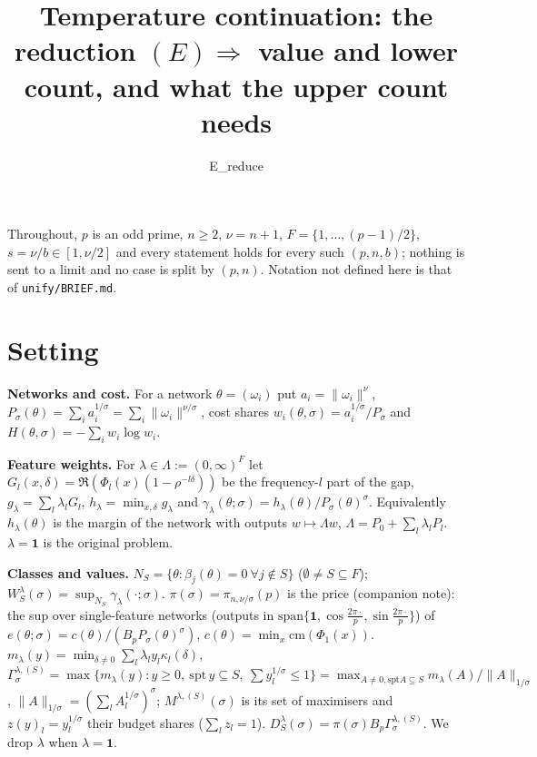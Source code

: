 \documentclass[11pt]{article}
\theoremstyle{remark}\newtheorem{remark}[theorem]{Remark}
\begin{document}
\title{Temperature continuation: the reduction $(E)\Rightarrow$ value and lower count, and what the upper count needs}
\author{E\_reduce}\date{}\maketitle

Throughout, $p$ is an odd prime, $n\ge2$, $\nu=n+1$, $F=\{1,\dots,(p-1)/2\}$, $s=\nu/b\in[1,\nu/2]$ and every
statement holds for every such $(p,n,b)$; nothing is sent to a limit and no case is split by $(p,n)$.
Notation not defined here is that of \texttt{unify/BRIEF.md}.

\section{Setting}
\textbf{Networks and cost.} For a network $\theta=(\omega_i)$ put $a_i=\|\omega_i\|^\nu$, $P_\sigma(\theta)=\sum_ia_i^{1/\sigma}
=\sum_i\|\omega_i\|^{\nu/\sigma}$, cost shares $w_i(\theta,\sigma)=a_i^{1/\sigma}/P_\sigma$ and $H(\theta,\sigma)=-\sum_iw_i\log w_i$.

\textbf{Feature weights.} For $\lambda\in\Lambda:=(0,\infty)^F$ let $G_l(x,\delta)=\Re(\Phi_l(x)(1-\rho^{-l\delta}))$ be the
frequency-$l$ part of the gap, $g_\lambda=\sum_l\lambda_lG_l$, $h_\lambda=\min_{x,\delta}g_\lambda$ and
$\gamma_\lambda(\theta;\sigma)=h_\lambda(\theta)/P_\sigma(\theta)^\sigma$. Equivalently $h_\lambda(\theta)$ is the margin of the
network with outputs $w\mapsto\Lambda w$, $\Lambda=P_0+\sum_l\lambda_lP_l$. $\lambda=\mathbf 1$ is the original problem.

\textbf{Classes and values.} $N_S=\{\theta:\beta_j(\theta)=0\ \forall j\notin S\}$ ($\emptyset\ne S\subseteq F$);
$W^\lambda_S(\sigma)=\sup_{N_S}\gamma_\lambda(\cdot;\sigma)$. $\pi(\sigma)=\pi_{n,\nu/\sigma}(p)$ is the price
(companion note): the sup over single-feature networks (outputs in $\mathrm{span}\{\mathbf1,\cos\frac{2\pi\cdot}p,\sin\frac{2\pi\cdot}p\}$)
of $e(\theta;\sigma)=c(\theta)/(B_pP_\sigma(\theta)^\sigma)$, $c(\theta)=\min_x\mathrm{cm}(\Phi_1(x))$.
$m_\lambda(y)=\min_{\delta\ne0}\sum_l\lambda_ly_l\kappa_l(\delta)$,
$\Gamma^{\lambda,(S)}_\sigma=\max\{m_\lambda(y):y\ge0,\ \mathrm{spt}\,y\subseteq S,\ \sum y_l^{1/\sigma}\le1\}
=\max_{A\ne0,\mathrm{spt}A\subseteq S}m_\lambda(A)/\|A\|_{1/\sigma}$, $\|A\|_{1/\sigma}=(\sum_lA_l^{1/\sigma})^\sigma$;
$M^{\lambda,(S)}(\sigma)$ is its set of maximisers and $z(y)_l=y_l^{1/\sigma}$ their budget shares ($\sum_lz_l=1$).
$D^\lambda_S(\sigma)=\pi(\sigma)B_p\Gamma^{\lambda,(S)}_\sigma$. We drop $\lambda$ when $\lambda=\mathbf1$.
\end{document}
